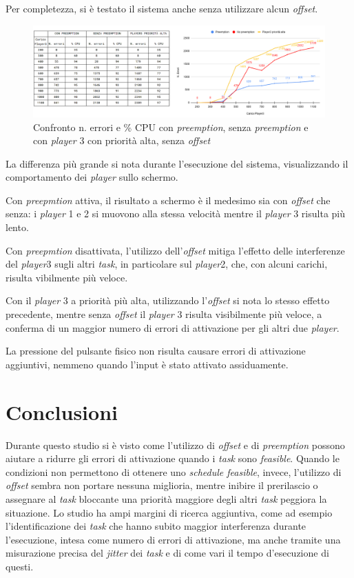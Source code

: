 \documentclass{article}
\begin{document}
Per completezza, si è testato il sistema anche senza utilizzare alcun \textit{offset}.
\begin{figure}[H]
	\centering
	\includegraphics[width=7in]{image/CARICO-AUTOSTART.png}
	\caption{Confronto n. errori e \% CPU con \textit{preemption}, senza \textit{preemption} e con \textit{player} 3 con priorità alta, senza \textit{offset}}
	\label{siC-noO}
\end{figure}
La differenza più grande si nota durante l'esecuzione del sistema, visualizzando il comportamento dei \textit{player} sullo schermo. 

Con \textit{preepmtion} attiva, il risultato a schermo è il medesimo sia con \textit{offset} che senza: i \textit{player} 1 e 2 si muovono alla stessa velocità mentre il \textit{player} 3 risulta più lento.

Con \textit{preepmtion} disattivata, l'utilizzo dell'\textit{offset} mitiga l'effetto delle interferenze del \textit{player}3 sugli altri \textit{task}, in particolare sul \textit{player}2, che, con alcuni carichi, risulta vibilmente più veloce.

Con il \textit{player} 3 a priorità più alta, utilizzando l'\textit{offset} si nota lo stesso effetto precedente, mentre senza \textit{offset} il \textit{player} 3 risulta visibilmente più veloce, a conferma di un maggior numero di errori di attivazione per gli altri due \textit{player}.

La pressione del pulsante fisico non risulta causare errori di attivazione aggiuntivi, nemmeno quando l'input è stato attivato assiduamente.

\section{Conclusioni}
Durante questo studio si è visto come l'utilizzo di \textit{offset} e di \textit{preemption} possono aiutare a ridurre gli errori di attivazione quando i \textit{task} sono \textit{feasible}. Quando le condizioni non permettono di ottenere uno \textit{schedule feasible}, invece, l'utilizzo di \textit{offset} sembra non portare nessuna miglioria, mentre inibire il prerilascio o assegnare al \textit{task} bloccante una priorità maggiore degli altri \textit{task} peggiora la situazione.
Lo studio ha ampi margini di ricerca aggiuntiva, come ad esempio l'identificazione dei \textit{task} che hanno subito maggior interferenza durante l'esecuzione, intesa come numero di errori di attivazione, ma anche tramite una misurazione precisa del \textit{jitter} dei \textit{task} e di come vari il tempo d'esecuzione di questi.
\end{document}
